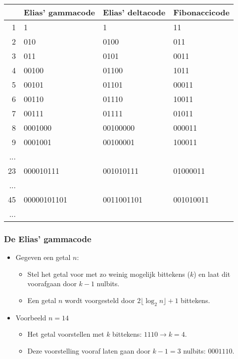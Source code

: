 \begin{table}[ht]
    \centering
    \begin{tabular}{|r | l | l | l |}
        \hline
        & Elias' gammacode & Elias' deltacode & Fibonaccicode \\
        \hline
        1 & 1 & 1 & 11  \\
        2 & 010 & 0100 & 011 \\
        3 & 011 & 0101 & 0011  \\
        4 & 00100 & 01100 & 1011  \\
        5 & 00101 & 01101 & 00011  \\
        6 & 00110 & 01110 & 10011  \\
        7 & 00111 & 01111 & 01011  \\
        8 & 0001000 & 00100000 & 000011  \\
        9 & 0001001 & 00100001 & 100011  \\
        ... &  &  &   \\
        23 & 000010111 & 001010111 & 01000011  \\
        ... &  &  &   \\
        45 & 00000101101 & 0011001101 & 001010011  \\
        ... &  &  &   \\

        \hline
    \end{tabular}
\end{table}

\subsubsection{De Elias' gammacode}
\begin{itemize}
    \item Gegeven een getal $n$:
    \begin{itemize}
        \item Stel het getal voor met zo weinig mogelijk bittekens ($k$) en laat dit voorafgaan door $k - 1$ nulbits.
        \item Een getal $n$ wordt voorgesteld door $2\lfloor \log_2 n\rfloor + 1$ bittekens.
    \end{itemize}
    \item Voorbeeld $n = 14$
    \begin{itemize}
        \item Het getal voorstellen met $k$ bittekens: $1110 \rightarrow k = 4$.
        \item Deze voorstelling vooraf laten gaan door $k - 1 = 3$ nulbits: $0001110$.
    \end{itemize}
\end{itemize}

